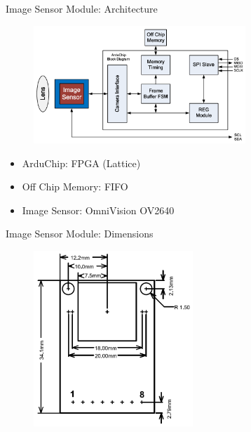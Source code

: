 \begin{frame}{Image Sensor Module: Architecture}

    \begin{figure}[!ht]
        \begin{center}
            \includegraphics[width=8cm]{figures/arducam-block-diagram}
        \end{center}
    \end{figure}        
    
    \begin{itemize}
        \item ArduChip: FPGA (Lattice)
        \item Off Chip Memory: FIFO
        \item Image Sensor: OmniVision OV2640
    \end{itemize}
                        
\end{frame}             
 

\begin{frame}{Image Sensor Module: Dimensions}

    \begin{figure}[!ht]
        \begin{center}
            \includegraphics[width=6cm]{figures/arducam-dimensions}
        \end{center}
    \end{figure}        
    
\end{frame}             

